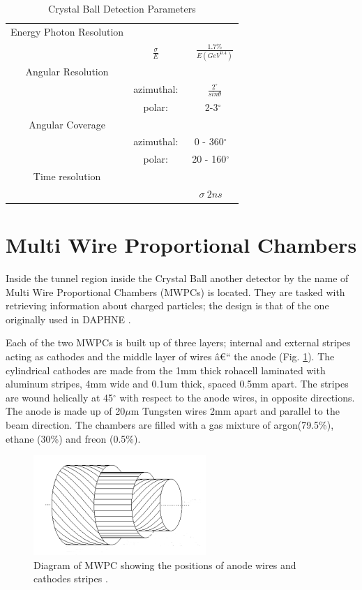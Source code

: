 \begin{table}[ht]
\caption{Crystal Ball Detection Parameters}
\centering
\begin{tabular}{c c c}
\hline\hline
Energy Photon Resolution & &  \\
 & $\frac{\sigma}{E}$ & ~ $\frac{1.7\%}{E(GeV^{0.4})}$ \\
\hline
Angular Resolution & & \\
 & azimuthal: & ~ $\frac{2^{\circ}}{sin\theta}$ \\
 & polar: & ~2-3$^{\circ}$ \\
\hline
Angular Coverage & & \\
 & azimuthal: & 0 - 360$^{\circ}$ \\
 & polar: & 20 - 160$^{\circ}$ \\
\hline
Time resolution & & \\
 & & $\sigma ~ 2ns$ \\ [1ex]
\hline\hline
\end{tabular}
\label{table_cbparam}
\end{table} 
 

\section{Multi Wire Proportional Chambers}

\indent Inside the tunnel region inside the Crystal Ball another detector by the name of Multi Wire Proportional Chambers (MWPCs) is located. They are tasked with retrieving  information  about  charged particles;  the  design  is that  of  the  one originally used in DAPHNE \cite{audit}.

\indent Each of the two MWPCs is built up of three layers; internal and external stripes acting as cathodes and the middle layer of wires â€“ the anode (Fig. \ref{mwpc}). The cylindrical  cathodes  are  made  from  the  1mm  thick  rohacell  laminated  with aluminum stripes, 4mm wide and  0.1um thick, spaced 0.5mm apart. The stripes are  wound  helically  at  45$^{\circ}$  with  respect  to  the  anode  wires,  in  opposite directions.  The  anode  is  made  up  of  20$\mu$m  Tungsten  wires  2mm  apart  and parallel to the beam direction. The chambers are filled with a gas mixture of argon(79.5\%), ethane (30\%) and freon (0.5\%).

\begin{figure}[H]
\begin{center}
\includegraphics[scale=1.0]{pictures/png/mwpc.png}
\caption{Diagram of MWPC showing the positions of anode wires and cathodes stripes \cite{jalbert}.}
\label{mwpc}
\end{center}
\end{figure}


